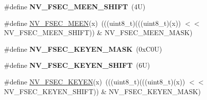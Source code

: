 \begin{DoxyCompactItemize}
\#define {\bfseries N\+V\+\_\+\+F\+S\+E\+C\+\_\+\+M\+E\+E\+N\+\_\+\+S\+H\+I\+FT}~(4\+U)
\item 
\#define \mbox{\hyperlink{group___n_v___register___masks_ga6a3e909b41d8dd2ca5f55b10e8cc4e52}{N\+V\+\_\+\+F\+S\+E\+C\+\_\+\+M\+E\+EN}}(x)~(((uint8\+\_\+t)(((uint8\+\_\+t)(x)) $<$$<$ N\+V\+\_\+\+F\+S\+E\+C\+\_\+\+M\+E\+E\+N\+\_\+\+S\+H\+I\+FT)) \& N\+V\+\_\+\+F\+S\+E\+C\+\_\+\+M\+E\+E\+N\+\_\+\+M\+A\+SK)
\item 
\mbox{\label{group___n_v___register___masks_ga50a87e963eeaaf5fdb904e7bac9099af}} 
\#define {\bfseries N\+V\+\_\+\+F\+S\+E\+C\+\_\+\+K\+E\+Y\+E\+N\+\_\+\+M\+A\+SK}~(0x\+C0\+U)
\item 
\mbox{\label{group___n_v___register___masks_ga3df55e24a4dc42a19afc15b4a3137bae}} 
\#define {\bfseries N\+V\+\_\+\+F\+S\+E\+C\+\_\+\+K\+E\+Y\+E\+N\+\_\+\+S\+H\+I\+FT}~(6\+U)
\item 
\#define \mbox{\hyperlink{group___n_v___register___masks_gaca6379e60e0371d1d0c8493abe9db870}{N\+V\+\_\+\+F\+S\+E\+C\+\_\+\+K\+E\+Y\+EN}}(x)~(((uint8\+\_\+t)(((uint8\+\_\+t)(x)) $<$$<$ N\+V\+\_\+\+F\+S\+E\+C\+\_\+\+K\+E\+Y\+E\+N\+\_\+\+S\+H\+I\+FT)) \& N\+V\+\_\+\+F\+S\+E\+C\+\_\+\+K\+E\+Y\+E\+N\+\_\+\+M\+A\+SK)
\end{DoxyCompactItemize}
